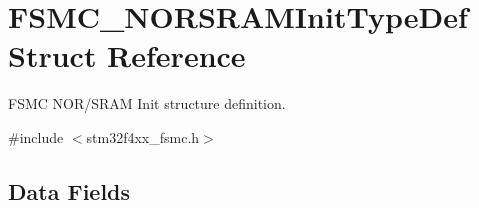 \hypertarget{struct_f_s_m_c___n_o_r_s_r_a_m_init_type_def}{\section{F\-S\-M\-C\-\_\-\-N\-O\-R\-S\-R\-A\-M\-Init\-Type\-Def Struct Reference}
\label{struct_f_s_m_c___n_o_r_s_r_a_m_init_type_def}
}


F\-S\-M\-C N\-O\-R/\-S\-R\-A\-M Init structure definition.  




{\ttfamily \#include $<$stm32f4xx\-\_\-fsmc.\-h$>$}

\subsection*{Data Fields}
